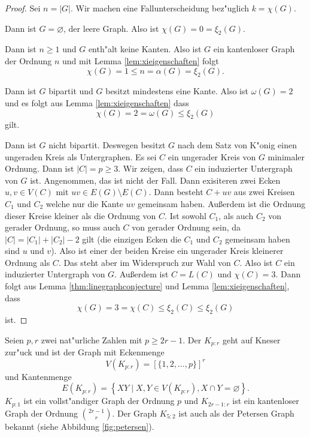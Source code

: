 \begin{proof}
  Sei $n=|G|$. Wir machen eine Fallunterscheidung bez"uglich $k=\chi(G)$.

   Dann ist $G=\varnothing$, der leere Graph. Also ist $\chi(G) = 0 = \xi_{2}(G)$. 

   Dann ist $n\geq 1$ und $G$ enth"alt keine Kanten. Also ist $G$ ein kantenloser Graph der Ordnung $n$ und mit Lemma \ref{lem:xieigenschaften} folgt
  $$\chi(G) = 1 \leq n = \alpha(G) = \xi_{2}(G).$$

   Dann ist $G$ bipartit und $G$ besitzt mindestens eine Kante. Also ist $\omega(G) = 2$ und es folgt aus Lemma \ref{lem:xieigenschaften} dass
  $$\chi(G) = 2 = \omega(G) \leq \xi_{2}(G)$$
  gilt.

   Dann ist $G$ nicht bipartit. Deswegen besitzt $G$ nach dem Satz von K"onig einen ungeraden Kreis als Untergraphen. Es sei $C$ ein ungerader Kreis von $G$ minimaler Ordnung. Dann ist $|C| = p \geq 3$. 
  Wir zeigen, dass $C$ ein induzierter Untergraph von $G$ ist. Angenommen, das ist nicht der Fall. Dann exisiteren zwei Ecken $u,v\in V(C)$ mit $uv\in E(G) \setminus E(C)$. Dann besteht $C+uv$ aus zwei Kreisen $C_1$ und $C_2$ welche nur die Kante $uv$ gemeinsam haben. Au{\ss}erdem ist die Ordnung dieser Kreise kleiner als die Ordnung von $C$.
  Ist sowohl $C_1$, als auch $C_2$ von gerader Ordnung, so muss auch $C$ von gerader Ordnung sein, da $|C| = |C_1| + |C_2| -2$ gilt (die einzigen Ecken die $C_1$ und $C_2$ gemeinsam haben sind $u$ und $v$). Also ist einer der beiden Kreise ein ungerader Kreis kleinerer Ordnung als $C$. Das steht aber im Widerspruch zur Wahl von $C$. 
  Also ist $C$ ein induzierter Untergraph von $G$. Au{\ss}erdem ist $C=L(C)$ und $\chi(C) = 3$. Dann folgt aus Lemma \ref{thm:linegraphconjecture} und Lemma \ref{lem:xieigenschaften}, dass 
  $$\chi(G) = 3 = \chi(C) \leq \xi_{2}(C) \leq \xi_{2}(G)$$
  ist.
\end{proof}


Seien $p,r$ zwei nat"urliche Zahlen mit $p\geq 2r-1$. Der  $K_{p:r}$ geht auf Kneser \cite{Kneser55} zur"uck und ist der Graph mit Eckenmenge $$V(K_{p:r}) = [\{1,2,\dots,p\}]^{r}$$ und Kantenmenge 
$$E(K_{p:r}) = \left\{ XY\;|\; X,Y \in V(K_{p:r}), X \cap Y = \varnothing \right\}.$$ 
$K_{p:1}$ ist ein vollst"andiger Graph der Ordnung $p$ und $K_{2r-1:r}$ ist ein kantenloser Graph der Ordnung $\binom{2r-1}{r}$.
Der Graph $K_{5:2}$ ist auch als der Petersen Graph bekannt (siehe Abbildung \ref{fig:petersen}).

